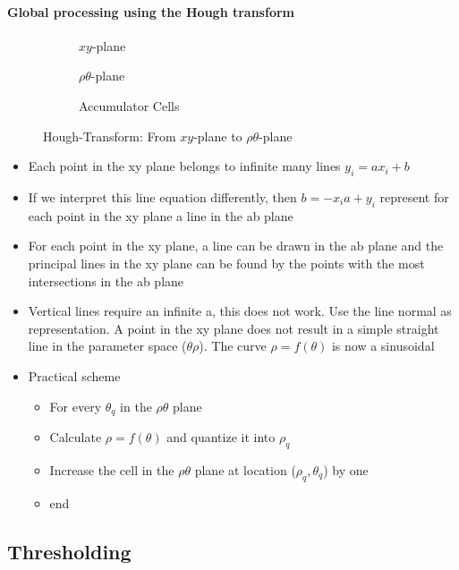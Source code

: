 \paragraph{Global processing using the Hough transform}
\begin{figure}[h]
	\centering
	\begin{subfigure}{0.3\textwidth}
		
		\caption{$xy$-plane}
	\end{subfigure}
	\begin{subfigure}{0.3\textwidth}
		
		\caption{$\rho\theta$-plane}
	\end{subfigure}
	\begin{subfigure}{0.3\textwidth}
		
		\caption{Accumulator Cells}
	\end{subfigure}
	\caption{Hough-Transform: From $xy$-plane to $\rho\theta$-plane}
\end{figure}
\begin{itemize}
\item Each point in the xy plane belongs to infinite many lines $y_i=ax_i+b$
\item If we interpret this line equation differently, then $b=-x_ia+y_i$ represent for each point in the xy plane a line in the ab plane
\item For each point in the xy plane, a line can be drawn in the ab plane and the principal lines in the xy plane can be found by the points with the most intersections in the ab plane
\item Vertical lines require an infinite a, this does not work. Use the line normal as representation. A point in the xy plane does not result in a simple straight line in the parameter space ($\theta\rho$). The curve $\rho = f(\theta)$ is now a sinusoidal
\item Practical scheme
\begin{itemize}
\item For every $\theta_q$ in the $\rho\theta$ plane
\item Calculate $\rho = f(\theta)$ and quantize it into $\rho_q$
\item Increase the cell in the $\rho\theta$ plane at location ($\rho_q, \theta_q$) by one
\item end
\end{itemize}
\end{itemize}

\subsection{Thresholding}
